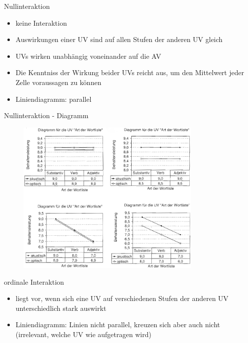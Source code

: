 \documentclass{beamer}
\begin{document}
	
	\begin{frame}{Nullinteraktion}
		\begin{itemize}
			\item keine Interaktion
			\item Auswirkungen einer UV sind auf allen Stufen der anderen UV gleich
			\item UVs wirken unabhängig voneinander auf die AV
			\item Die Kenntniss der Wirkung beider UVs reicht aus, um den Mittelwert jeder Zelle voraussagen zu können
			\item Liniendiagramm: parallel
		\end{itemize}
	\end{frame}
	
	\begin{frame}{Nullinteraktion - Diagramm}
		\begin{figure}
			\centering
			\includegraphics[width=0.8\textwidth]{Bilder/NullI.png}
		\end{figure}
	\end{frame}
	
	\begin{frame}{ordinale Interaktion}
		\begin{itemize}
			\item liegt vor, wenn sich eine UV auf verschiedenen Stufen der anderen UV unterschiedlich stark auswirkt
			\item Liniendiagramm: Linien nicht parallel, kreuzen sich aber auch nicht (irrelevant, welche UV wie aufgetragen wird)
		\end{itemize}
	\end{frame}
	
\end{document}
